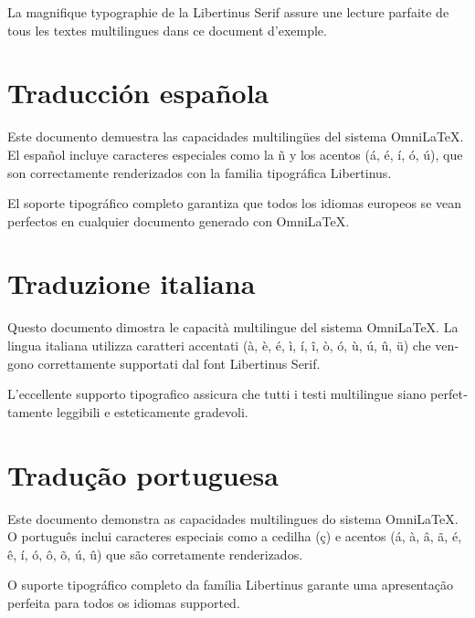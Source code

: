 \documentclass[
    language=english,
    doctype=article,
    institution=none,
]{../../omnilatex}
\begin{document}
\foreignlanguage{french}{
    La magnifique typographie de la Libertinus Serif assure une lecture parfaite
    de tous les textes multilingues dans ce document d'exemple.
}

\section{\foreignlanguage{spanish}{Traducción española}}

\foreignlanguage{spanish}{
    Este documento demuestra las capacidades multilingües del sistema OmniLaTeX.
    El español incluye caracteres especiales como la ñ y los acentos (á, é, í, ó, ú),
    que son correctamente renderizados con la familia tipográfica Libertinus.
}

\foreignlanguage{spanish}{
    El soporte tipográfico completo garantiza que todos los idiomas europeos
    se vean perfectos en cualquier documento generado con OmniLaTeX.
}

\section{\foreignlanguage{italian}{Traduzione italiana}}

\foreignlanguage{italian}{
    Questo documento dimostra le capacità multilingue del sistema OmniLaTeX.
    La lingua italiana utilizza caratteri accentati (à, è, é, ì, í, î, ò, ó, ù, ú, û, ü)
    che vengono correttamente supportati dal font Libertinus Serif.
}

\foreignlanguage{italian}{
    L'eccellente supporto tipografico assicura che tutti i testi multilingue
    siano perfettamente leggibili e esteticamente gradevoli.
}

\section{\foreignlanguage{portuguese}{Tradução portuguesa}}

\foreignlanguage{portuguese}{
    Este documento demonstra as capacidades multilingues do sistema OmniLaTeX.
    O português inclui caracteres especiais como a cedilha (ç) e acentos (á, à, â, ã,
    é, ê, í, ó, ô, õ, ú, û) que são corretamente renderizados.
}

\foreignlanguage{portuguese}{
    O suporte tipográfico completo da família Libertinus garante uma
    apresentação perfeita para todos os idiomas supported.
}

\end{document}
